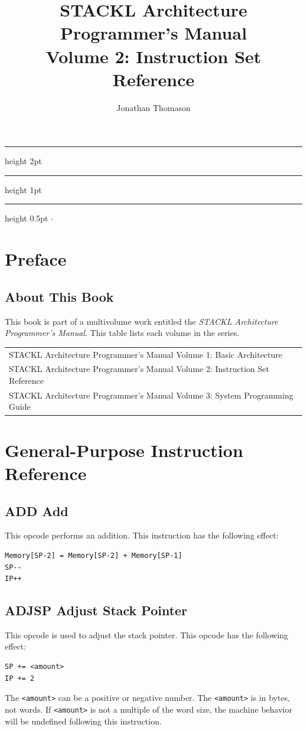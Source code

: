 \documentclass[11pt,a4paper,oneside]{book}
\title{
    STACKL Architecture\\
    Programmer's Manual\\
    \large Volume 2: Instruction Set Reference
}
\author{Jonathan Thomason}
\makeatletter
\renewcommand{\maketitle}{%
  \vspace*{2cm} %
  \begin{center}
    \begingroup
      \hrule height 2pt %
      \vspace{0.5\baselineskip}
      {\Huge \bfseries \@title \par}%
      \vspace{0.5\baselineskip}
      \hrule height 1pt %
    \endgroup
    \par
  \end{center}
  \vfill %
  \begin{center}
    \begingroup
      \footnotesize
      \hrule height 0.5pt %
      \vspace{0.5em}
      \@author \quad $\cdot$ \quad \@date %
      \vspace{0.5em}
    \endgroup
  \end{center}
}
\makeatother
\begin{document}
\frontmatter
\thispagestyle{empty}
\maketitle

\setcounter{page}{0}
\tableofcontents


\chapter{Preface}

\section{About This Book}
This book is part of a multivolume work entitled the \textit{STACKL Architecture
Programmer's Manual}. This table lists each volume in the series.

\begin{table}[H]
\centering
	\begin{tabular}{l}
		STACKL Architecture Programmer's Manual Volume 1: Basic Architecture\\
		STACKL Architecture Programmer's Manual Volume 2: Instruction Set Reference\\
		STACKL Architecture Programmer's Manual Volume 3: System Programming Guide\\
	\end{tabular}
\end{table}

\mainmatter

\chapter{General-Purpose Instruction Reference}

\pagebreak
\section[ADD]{\texorpdfstring{ADD \hfill Add}{ADD -- Add}}
This opcode performs an addition. This instruction has the following effect:
\begin{verbatim}
Memory[SP-2] = Memory[SP-2] + Memory[SP-1]
SP--
IP++
\end{verbatim}

\pagebreak
\section[ADJSP]{\texorpdfstring{ADJSP \hfill Adjust Stack Pointer}{ADJSP -- Adjust Stack Pointer}}
This opcode is used to adjust the stack pointer. This opcode has the following effect:
\begin{verbatim}
SP += <amount>
IP += 2
\end{verbatim}
The \verb|<amount>| can be a positive or negative number. The \verb|<amount>| is in bytes, not
words. If \verb|<amount>| is not a multiple of the word size, the machine behavior will be
undefined following this instruction.
\end{document}
